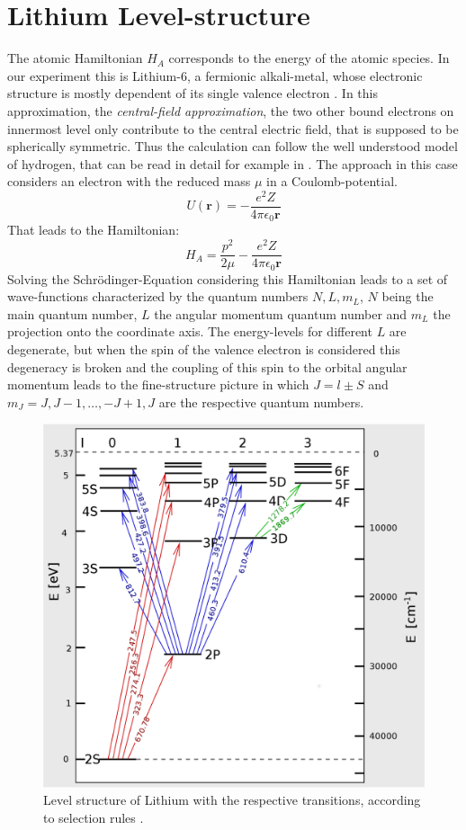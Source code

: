 \section{Lithium Level-structure}
The atomic Hamiltonian $H_A$ corresponds to the energy of the atomic species. In our experiment this is Lithium-6, a fermionic alkali-metal, whose electronic structure is mostly dependent of its single valence electron \cite{gehm}. In this approximation, the \textit{central-field approximation}, the two other bound electrons on innermost level only contribute to the central electric field, that is supposed to be spherically symmetric. Thus the calculation can follow the well understood model of hydrogen, that can be read in detail for example in \cite{demtroder}. The approach in this case considers an electron with the reduced mass $\mu$ in a Coulomb-potential.
\begin{equation}
U(\boldsymbol{r})=-\frac{e^2Z}{4\pi\epsilon_0\boldsymbol{r}}
\end{equation}
That leads to the Hamiltonian:
\begin{equation}
H_A=\frac{p^2}{2\mu}-\frac{e^2Z}{4\pi\epsilon_0\boldsymbol{r}}
\end{equation}
Solving the Schrödinger-Equation considering this Hamiltonian leads to a set of wave-functions characterized by the quantum numbers $N,L,m_L$, $N$ being the main quantum number, $L$ the angular momentum quantum number and $m_L$ the projection onto the coordinate axis. The energy-levels for different $L$ are degenerate, but when the spin of the valence electron is considered this degeneracy is broken and the coupling of this spin to the orbital angular momentum leads to the fine-structure picture in which $J=l\pm S$  and $m_J=J,J-1,\dots,-J+1,J$ are the respective quantum numbers.
\begin{figure}[H]
\begin{center}
\includegraphics[scale=.4] {levels2}
\end{center}
\caption{Level structure of Lithium with the respective transitions, according to selection rules \cite{transitions}.}
\label{levels2}
\end{figure}
